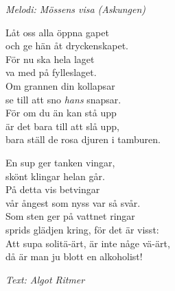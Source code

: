 {\footnotesize\textit{Melodi: Mössens visa (Askungen)}}\par
\vspace{10pt}
Låt oss alla öppna gapet\\
och ge hän åt dryckenskapet.\\
För nu ska hela laget\\
va med på fylleslaget.\\
Om grannen din kollapsar\\
se till att sno \textit{hans} snapsar.\\
För om du än kan stå upp\\
är det bara till att slå upp,\\
bara ställ de rosa djuren i tamburen.\par
\vspace{10pt}
En sup ger tanken vingar,\\
skönt klingar helan går.\\
På detta vis betvingar\\
vår ångest som nyss var så svår.\\
Som sten ger på vattnet ringar\\
sprids glädjen kring, för det är visst:\\
Att supa solitä-ärt, är inte någe vä-ärt,\\
då är man ju blott en alkoholist!\par
\vspace{10pt}
{\footnotesize\textit{Text: Algot Ritmer}}
